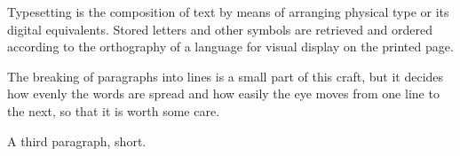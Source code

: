 \documentclass[parskip=full*]{scrartcl}
\begin{document}
Typesetting is the composition of text by means of arranging physical type or its digital equivalents. Stored letters and other symbols are retrieved and ordered according to the orthography of a language for visual display on the printed page.

The breaking of paragraphs into lines is a small part of this craft, but it decides how evenly the words are spread and how easily the eye moves from one line to the next, so that it is worth some care.

A third paragraph, short.
\end{document}
